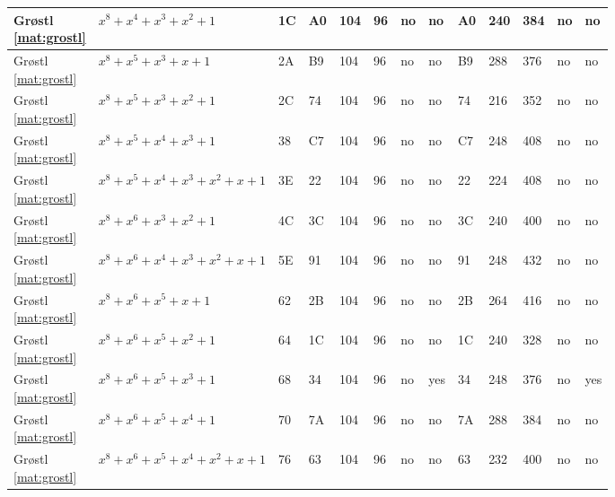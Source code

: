 \begin{tiny}
\begin{longtable}{|l|l|l|l|l|l|l|l|l|l|l|l|l|}
\shortstack{Gr{\o}stl \\ \eqref{mat:grostl}} & $x^8 + x^4 + x^3 + x^2 + 1$ & 1C & A0 & 104 & 96 & no & no & A0 & 240 & 384 & no & no \\ \hline
\shortstack{Gr{\o}stl \\ \eqref{mat:grostl}} & $x^8 + x^5 + x^3 + x + 1$ & 2A & B9 & 104 & 96 & no & no & B9 & 288 & 376 & no & no \\ \hline
\shortstack{Gr{\o}stl \\ \eqref{mat:grostl}} & $x^8 + x^5 + x^3 + x^2 + 1$ & 2C & 74 & 104 & 96 & no & no & 74 & 216 & 352 & no & no \\ \hline
\shortstack{Gr{\o}stl \\ \eqref{mat:grostl}} & $x^8 + x^5 + x^4 + x^3 + 1$ & 38 & C7 & 104 & 96 & no & no & C7 & 248 & 408 & no & no \\ \hline
\shortstack{Gr{\o}stl \\ \eqref{mat:grostl}} & $x^8 + x^5 + x^4 + x^3 + x^2 + x + 1$ & 3E & 22 & 104 & 96 & no & no & 22 & 224 & 408 & no & no \\ \hline
\shortstack{Gr{\o}stl \\ \eqref{mat:grostl}} & $x^8 + x^6 + x^3 + x^2 + 1$ & 4C & 3C & 104 & 96 & no & no & 3C & 240 & 400 & no & no \\ \hline
\shortstack{Gr{\o}stl \\ \eqref{mat:grostl}} & $x^8 + x^6 + x^4 + x^3 + x^2 + x + 1$ & 5E & 91 & 104 & 96 & no & no & 91 & 248 & 432 & no & no \\ \hline
\shortstack{Gr{\o}stl \\ \eqref{mat:grostl}} & $x^8 + x^6 + x^5 + x + 1$ & 62 & 2B & 104 & 96 & no & no & 2B & 264 & 416 & no & no \\ \hline
\shortstack{Gr{\o}stl \\ \eqref{mat:grostl}} & $x^8 + x^6 + x^5 + x^2 + 1$ & 64 & 1C & 104 & 96 & no & no & 1C & 240 & 328 & no & no \\ \hline
\shortstack{Gr{\o}stl \\ \eqref{mat:grostl}} & $x^8 + x^6 + x^5 + x^3 + 1$ & 68 & 34 & 104 & 96 & no & yes & 34 & 248 & 376 & no & yes \\ \hline
\shortstack{Gr{\o}stl \\ \eqref{mat:grostl}} & $x^8 + x^6 + x^5 + x^4 + 1$ & 70 & 7A & 104 & 96 & no & no & 7A & 288 & 384 & no & no \\ \hline
\shortstack{Gr{\o}stl \\ \eqref{mat:grostl}} & $x^8 + x^6 + x^5 + x^4 + x^2 + x + 1$ & 76 & 63 & 104 & 96 & no & no & 63 & 232 & 400 & no & no \\ \hline

\end{longtable}
\end{tiny}
